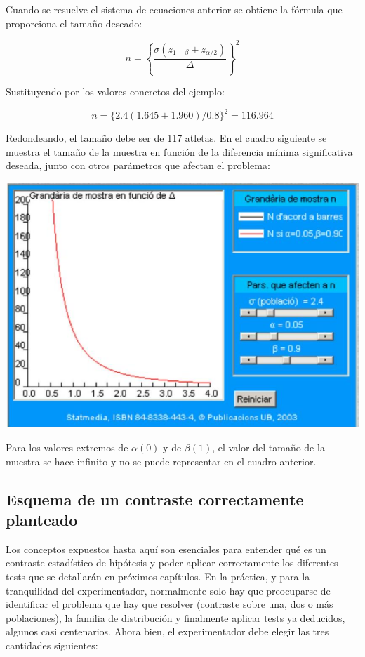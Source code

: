 \documentclass[
]{article}
\begin{document}
Cuando se resuelve el sistema de ecuaciones anterior se obtiene la fórmula que proporciona el tamaño deseado:

\[
n=\left\{\frac{\sigma\left(z_{1-\beta}+z_{\alpha / 2}\right)}{\Delta}\right\}^{2}
\]

Sustituyendo por los valores concretos del ejemplo:

\[
n=\{2.4(1.645+1.960)/0.8\}^{2}=116.964
\]

Redondeando, el tamaño debe ser de 117 atletas. En el cuadro siguiente se muestra el tamaño de la muestra en función de la diferencia mínima significativa deseada, junto con otros parámetros que afectan el problema:

\begin{center}\includegraphics[width=0.9\linewidth]{images/cap9-SampleSize_i_MDS} \end{center}

Para los valores extremos de \(\alpha(0)\) y de \(\beta(1)\), el valor del tamaño de la muestra se hace infinito y no se puede representar en el cuadro anterior.

\subsection{Esquema de un contraste correctamente planteado}\label{esquema-de-un-contraste-correctamente-planteado}

Los conceptos expuestos hasta aquí son esenciales para entender qué es un contraste estadístico de hipótesis y poder aplicar correctamente los diferentes tests que se detallarán en próximos capítulos. En la práctica, y para la tranquilidad del experimentador, normalmente solo hay que preocuparse de identificar el problema que hay que resolver (contraste sobre una, dos o más poblaciones), la familia de distribución y finalmente aplicar tests ya deducidos, algunos casi centenarios. Ahora bien, el experimentador debe elegir las tres cantidades siguientes:
\end{document}
